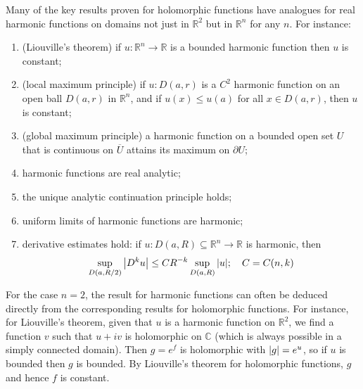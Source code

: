 \begin{remark}
	Many of the key results proven for holomorphic functions have analogues for real harmonic functions on domains not just in \( \mathbb R^2 \) but in \( \mathbb R^n \) for any \( n \).
	For instance:
	\begin{enumerate}
		\item (Liouville's theorem) if \( u \colon \mathbb R^n \to \mathbb R \) is a bounded harmonic function then \( u \) is constant;
		\item (local maximum principle) if \( u \colon D(a,r) \) is a \( C^2 \) harmonic function on an open ball \( D(a,r) \) in \( \mathbb R^n \), and if \( u(x) \leq u(a) \) for all \( x \in D(a,r) \), then \( u \) is constant;
		\item (global maximum principle) a harmonic function on a bounded open set \( U \) that is continuous on \( \overline U \) attains its maximum on \( \partial U \);
		\item harmonic functions are real analytic;
		\item the unique analytic continuation principle holds;
		\item uniform limits of harmonic functions are harmonic;
		\item derivative estimates hold: if \( u \colon D(a,R) \subseteq \mathbb R^n \to \mathbb R \) is harmonic, then
		      \[
			      \sup_{D(a,R/2)} \abs{D^k u} \leq CR^{-k} \sup_{D(a,R)} \abs{u};\quad C = C(n,k)
		      \]
	\end{enumerate}
	For the case \( n = 2 \), the result for harmonic functions can often be deduced directly from the corresponding results for holomorphic functions.
	For instance, for Liouville's theorem, given that \( u \) is a harmonic function on \( \mathbb R^2 \), we find a function \( v \) such that \( u + iv \) is holomorphic on \( \mathbb C \) (which is always possible in a simply connected domain).
	Then \( g = e^f \) is holomorphic with \( \abs{g} = e^u \), so if \( u \) is bounded then \( g \) is bounded.
	By Liouville's theorem for holomorphic functions, \( g \) and hence \( f \) is constant.
\end{remark}

